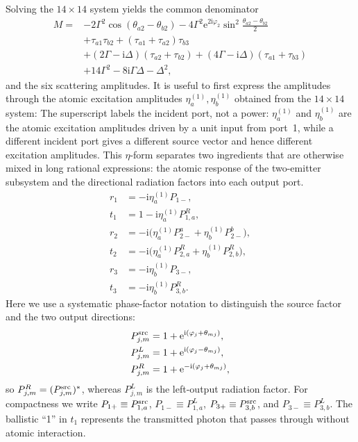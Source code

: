 \documentclass[aps,pra,reprint,superscriptaddress,nofootinbib,longbibliography,floatfix]{revtex4-2}
\newcommand{\ii}{\mathrm{i}}
\newcommand{\ee}{\mathrm{e}}
\newcommand{\Del}{\Delta}
\newcommand{\Gam}{\Gamma}
\newcommand{\ph}{\varphi}
\newcommand{\thatwo}{\theta_{a2}}
\newcommand{\thbtwo}{\theta_{b2}}
\newcommand{\Poneplus}{P_{1+}}
\newcommand{\Poneminus}{P_{1-}}
\newcommand{\Pthreeplus}{P_{3+}}
\newcommand{\Pthreeminus}{P_{3-}}
\begin{document}
Solving the $14\times14$ system yields the common denominator
\begin{align}
M =& -2\Gam^2\cos(\thatwo-\thbtwo)
     - 4\Gam^2\ee^{2\ii\ph_2}
       \sin^2\frac{\thatwo-\thbtwo}{2} \nonumber\\
   & + \tau_{a1}\tau_{b2}
     + (\tau_{a1}+\tau_{a2})\tau_{b3} \nonumber\\
   & + (2\Gam-\ii\Del)(\tau_{a2}+\tau_{b2})
     + (4\Gam-\ii\Del)(\tau_{a1}+\tau_{b3}) \nonumber\\
   & + 14\Gam^2 - 8\ii\Gam\Del - \Del^2,
\label{eq:M}
\end{align}
and the six scattering amplitudes.
It is useful to first express the amplitudes through the atomic excitation amplitudes $\eta_a^{(1)},\eta_b^{(1)}$ obtained from the $14\times14$ system:
The superscript labels the incident port, not a power: $\eta_a^{(1)}$ and $\eta_b^{(1)}$ are the atomic excitation amplitudes driven by a unit input from port~1, while a different incident port gives a different source vector and hence different excitation amplitudes.
This $\eta$-form separates two ingredients that are otherwise mixed in long rational expressions: the atomic response of the two-emitter subsystem and the directional radiation factors into each output port.
\begin{subequations}
\label{eq:wg1_amps_eta}
\begin{align}
r_1 &= -\ii\eta_a^{(1)} P_{1-}, \label{eq:r1_eta}\\[2pt]
t_1 &= 1 - \ii\eta_a^{(1)} P_{1,a}^{R}, \label{eq:t1_eta}\\[2pt]
r_2 &= -\ii\bigl(\eta_a^{(1)} P_{2-}^a + \eta_b^{(1)} P_{2-}^b\bigr), \label{eq:r2_eta}\\[2pt]
t_2 &= -\ii\bigl(\eta_a^{(1)} P_{2,a}^{R} + \eta_b^{(1)} P_{2,b}^{R}\bigr), \label{eq:t2_eta}\\[2pt]
r_3 &= -\ii\eta_b^{(1)} P_{3-}, \label{eq:r3_eta}\\[2pt]
t_3 &= -\ii\eta_b^{(1)} P_{3,b}^{R}. \label{eq:t3_eta}
\end{align}
\end{subequations}
Here we use a systematic phase-factor notation to distinguish the source factor and the two output directions:
\begin{equation}
\begin{aligned}
P_{j,m}^{\rm src}&=1+\ee^{\ii(\ph_j+\theta_{mj})},\\
P_{j,m}^{L}&=1+\ee^{\ii(\ph_j-\theta_{mj})},\\
P_{j,m}^{R}&=1+\ee^{-\ii(\ph_j+\theta_{mj})},
\end{aligned}
\label{eq:Pnotation_wg1}
\end{equation}
so $P_{j,m}^{R}=(P_{j,m}^{\rm src})^*$, whereas $P_{j,m}^{L}$ is the left-output radiation factor.
For compactness we write $\Poneplus\equiv P_{1,a}^{\rm src}$, $\Poneminus\equiv P_{1,a}^{L}$, $\Pthreeplus\equiv P_{3,b}^{\rm src}$, and $\Pthreeminus\equiv P_{3,b}^{L}$.
The ballistic ``1'' in $t_1$ represents the transmitted photon that passes through without atomic interaction.
\end{document}
